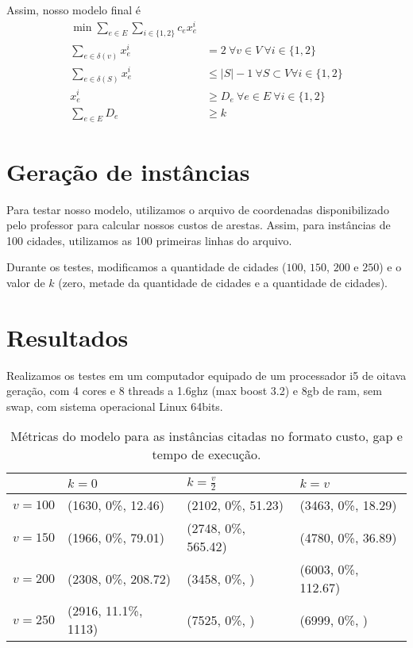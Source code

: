 \documentclass[11pt]{article}
\theoremstyle{definition}
\theoremstyle{definition}
\theoremstyle{remark}
\theoremstyle{remark}
\theoremstyle{remark}
\theoremstyle{remark}
\theoremstyle{definition}
\begin{document}
Assim, nosso modelo final é
\begin{align*}
\min \sum \limits_{e \in E} \sum \limits_{i \in \{1,2\}} c_{e} x_{e}^{i}& \\
\sum \limits_{e \in \delta(v)} x_{e}^{i} &= 2 \ \forall v \in V \ \forall i \in \{1,2\} \\
\sum \limits_{e \in \delta(S)} x_{e}^{i} &\leq |S| -1 \ \forall S \subset V \forall i \in \{1,2\} \\
x_{e}^{i} &\geq D_{e} \ \forall e \in E \ \forall i \in \{1,2\} \\
\sum \limits_{e \in E} D_{e} &\geq k
\end{align*}

\section{Geração de instâncias}
\label{sec:orgf5cbc12}
Para testar nosso modelo, utilizamos o arquivo de coordenadas disponibilizado pelo professor para calcular nossos custos de arestas. Assim, para instâncias de 100 cidades, utilizamos as 100 primeiras linhas do arquivo.

Durante os testes, modificamos a quantidade de cidades (\(100\), \(150\), \(200\) e \(250\)) e o valor de \(k\) (zero, metade da quantidade de cidades e a quantidade de cidades).
\section{Resultados}
\label{sec:orgc49a92c}

Realizamos os testes em um computador equipado de um processador i5 de oitava geração, com 4 cores e 8 threads a 1.6ghz (max boost 3.2) e 8gb de ram, sem swap, com sistema operacional Linux 64bits. 


\begin{table}[htbp]
\caption{Métricas do modelo para as instâncias citadas no formato custo, gap e tempo de execução.}
\centering
\begin{tabular}{llll}
 & \(k=0\) & \(k=\frac{v}{2}\) & \(k = v\)\\
\hline
\(v = 100\) & (1630, 0\%, 12.46) & (2102, 0\%, 51.23) & (3463, 0\%, 18.29)\\
\(v = 150\) & (1966, 0\%, 79.01) & (2748, 0\%, 565.42) & (4780, 0\%, 36.89)\\
\(v = 200\) & (2308, 0\%, 208.72) & (3458, 0\%, ) & (6003, 0\%, 112.67)\\
\(v = 250\) & (2916, 11.1\%, 1113) & (7525, 0\%, ) & (6999, 0\%, )\\
\end{tabular}
\end{table}
\end{document}
